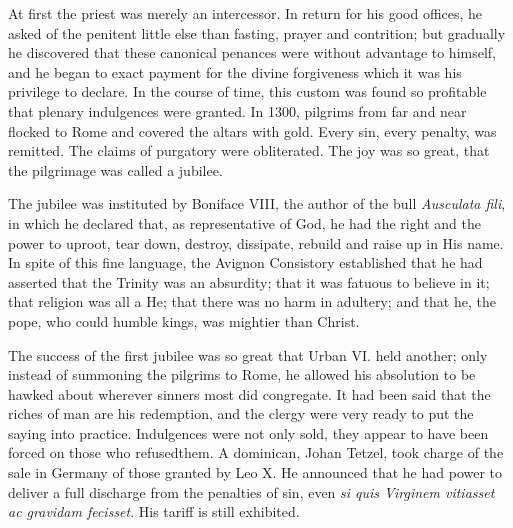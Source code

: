 \documentclass[]{book}
\begin{document}
At first the priest was merely an intercessor. In return for his good
offices, he asked of the penitent little else than fasting, prayer and
contrition; but gradually he discovered that these canonical penances
were without advantage to himself, and he began to exact payment for the
divine forgiveness which it was his privilege to declare. In the course
of time, this custom was found so profitable that plenary indulgences
were granted. In 1300, pilgrims from far and near flocked to Rome and
covered the altars with gold. Every sin, every penalty, was remitted.
The claims of purgatory were obliterated. The joy was so great, that the
pilgrimage was called a jubilee.

The jubilee was instituted by Boniface VIII, the author of the bull
\emph{Ausculata fili}, in which he declared that, as representative of
God, he had the right and the power to uproot, tear down, destroy,
dissipate, rebuild and raise up in His name. In spite of this fine
language, the Avignon Consistory established that he had asserted that
the Trinity was an absurdity; that it was fatuous to believe in it; that
religion was all a He; that there was no harm in adultery; and that he,
the pope, who could humble kings, was mightier than Christ.

The success of the first jubilee was so great that Urban VI. held
another; only instead of summoning the pilgrims to Rome, he allowed his
absolution to be hawked about wherever sinners most did congregate. It
had been said that the riches of man are his redemption, and the clergy
were very ready to put the saying into practice. Indulgences were not
only sold, they appear to have been forced on those who refusedthem. A
dominican, Johan Tetzel, took charge of the sale in Germany of those
granted by Leo X. He announced that he had power to deliver a full
discharge from the penalties of sin, even \emph{si quis Virginem
vitiasset ac gravidam fecisset}. His tariff is still exhibited.
\end{document}
